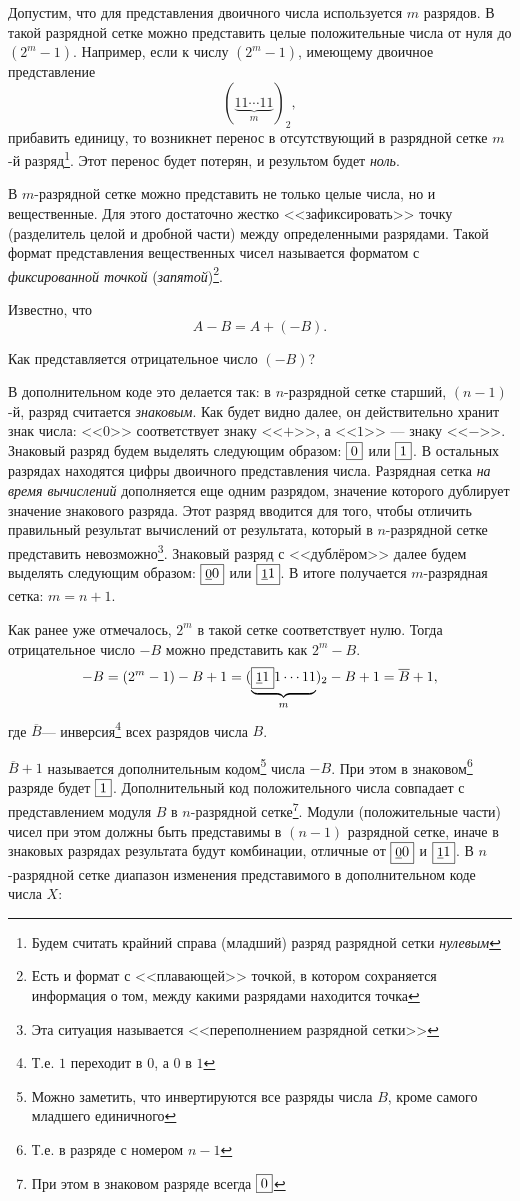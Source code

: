 Допустим, что для представления двоичного числа используется $m$ разрядов. В такой разрядной сетке можно представить целые положительные числа от нуля до $(2^{m}-1)$. Например, если к числу $(2^{m}-1)$, имеющему двоичное представление
\[
    (\underbrace{11\cdots 11}_m)_2,
\]
прибавить единицу, то возникнет перенос в отсутствующий в разрядной сетке $m$-й разряд\footnote{Будем считать крайний справа (младший) разряд разрядной сетки \emph{нулевым}}. Этот перенос будет потерян, и результом будет \emph{ноль}. 

В $m$-разрядной сетке можно представить не только целые числа, но и вещественные. Для этого достаточно жестко <<зафиксировать>> точку (разделитель целой и дробной части) между определенными разрядами. Такой формат представления вещественных чисел называется форматом с \emph{фиксированной точкой} (\emph{запятой})\footnote{Есть и формат с <<плавающей>> точкой, в котором сохраняется информация о том, между какими разрядами находится точка}.

Известно, что
\[A-B=A+(-B).\]

Как представляется отрицательное число $(-B)$?

В дополнительном коде это делается так: в $n$-разрядной сетке старший, $(n-1)$-й, разряд считается \emph{знаковым}. Как будет видно далее, он действительно хранит знак числа: <<$0$>> соответствует знаку <<$+$>>, а <<$1$>> --- знаку <<$-$>>. Знаковый разряд будем выделять следующим образом: $\fbox{0}$ или $\fbox{1}$. В остальных разрядах находятся цифры двоичного представления числа. Разрядная сетка \emph{на время вычислений} дополняется еще одним разрядом, значение которого дублирует значение знакового разряда. Этот разряд вводится для того, чтобы отличить правильный результат вычислений от результата, который в $n$-разрядной сетке представить невозможно\footnote{Эта ситуация называется <<переполнением разрядной сетки>>}. Знаковый разряд с <<дублёром>> далее будем выделять следующим образом: $\fbox{{\small{\underbar{0}}}{0}}$ или $\fbox{{\small{\underbar{1}}}{1}}$. В итоге получается $m$-разрядная сетка: $m=n+1$. 

Как ранее уже отмечалось, $2^m$ в такой сетке соответствует нулю. Тогда отрицательное число $-B$ можно представить как $2^m-B$.
\[
-B=(2^m-1)-B+1 = (\underbrace{\fbox{{\small{\underbar{1}}}{1}}1\cdots11}_{m})_{2}-B+1=\overline{B}+1,
\]
где $\overline{B}$--- инверсия\footnote{Т.е. $1$ переходит в $0$, а $0$ в $1$} всех разрядов числа $B$.

$\overline{B}+1$ называется дополнительным кодом\footnote{Можно заметить, что инвертируются все разряды числа $B$, кроме самого младшего единичного} числа $-B$. При этом в знаковом\footnote{Т.е. в разряде с номером $n-1$} разряде будет $\fbox{1}$. Дополнительный код положительного числа совпадает с представлением модуля $B$ в $n$-разрядной сетке\footnote{При этом в знаковом разряде всегда $\fbox{0}$}. Модули (положительные части) чисел при этом должны быть представимы в $(n-1)$ разрядной сетке, иначе в знаковых разрядах результата будут комбинации, отличные от $\fbox{{\small{\underbar{0}}}{0}}$ и $\fbox{{\small{\underbar{1}}}{1}}$. В $n$-разрядной сетке диапазон изменения представимого в дополнительном коде числа $X$:


